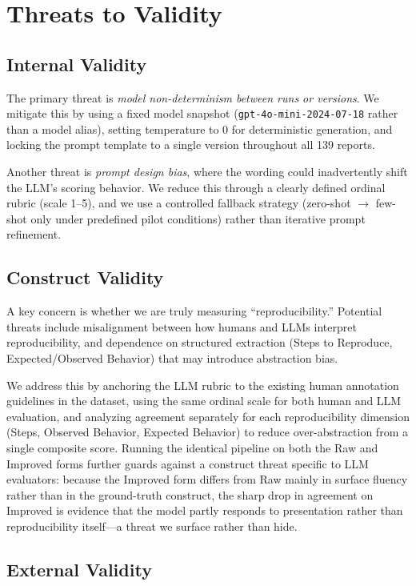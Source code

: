 \section{Threats to Validity}
\label{sec:threats}

\subsection{Internal Validity}
 
The primary threat is \emph{model non-determinism between runs or versions}. We mitigate this by using a fixed model snapshot (\texttt{gpt-4o-mini-2024-07-18} rather than a model alias), setting temperature to 0 for deterministic generation, and locking the prompt template to a single version throughout all 139 reports.
 
Another threat is \emph{prompt design bias}, where the wording could inadvertently shift the LLM's scoring behavior. We reduce this through a clearly defined ordinal rubric (scale 1--5), and we use a controlled fallback strategy (zero-shot $\to$ few-shot only under predefined pilot conditions) rather than iterative prompt refinement.
 
\subsection{Construct Validity}
 
A key concern is whether we are truly measuring ``reproducibility.'' Potential threats include misalignment between how humans and LLMs interpret reproducibility, and dependence on structured extraction (Steps to Reproduce, Expected/Observed Behavior) that may introduce abstraction bias.
 
We address this by anchoring the LLM rubric to the existing human annotation guidelines in the dataset, using the same ordinal scale for both human and LLM evaluation, and analyzing agreement separately for each reproducibility dimension (Steps, Observed Behavior, Expected Behavior) to reduce over-abstraction from a single composite score. Running the identical pipeline on both the Raw and Improved forms further guards against a construct threat specific to LLM evaluators: because the Improved form differs from Raw mainly in surface fluency rather than in the ground-truth construct, the sharp drop in agreement on Improved is evidence that the model partly responds to presentation rather than reproducibility itself---a threat we surface rather than hide.
 
\subsection{External Validity}
 
